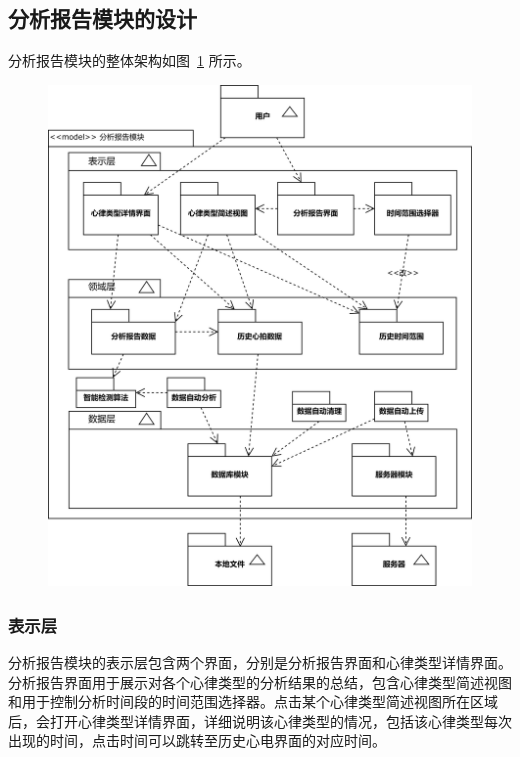 \subsection{分析报告模块的设计}\label{subsec:analytics-design}

分析报告模块的整体架构如图~\ref{fig:model-analytics} 所示。

\begin{figure}[!ht]
    \includegraphics[width=\textwidth]{../assets/model-analytics.drawio}
    \label{fig:model-analytics}
\end{figure}

\subsubsection{表示层}

分析报告模块的表示层包含两个界面，分别是分析报告界面和心律类型详情界面。分析报告界面用于展示对各个心律类型的分析结果的总结，包含心律类型简述视图和用于控制分析时间段的时间范围选择器。点击某个心律类型简述视图所在区域后，会打开心律类型详情界面，详细说明该心律类型的情况，包括该心律类型每次出现的时间，点击时间可以跳转至历史心电界面的对应时间。

